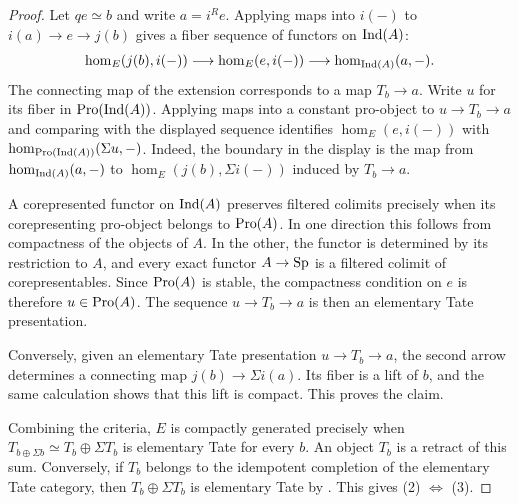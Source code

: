 \begin{proof}
		Let $qe\simeq b$ and write $a=i^Re$. Applying maps into $i(-)$ to $i(a)\to e\to j(b)$ gives a fiber sequence of functors on $\operatorname{Ind}(A)$:
		\[
			\hom_E(j(b),i(-))\longrightarrow\hom_E(e,i(-))\longrightarrow\hom_{\operatorname{Ind}(A)}(a,-).
		\]
		The connecting map of the extension corresponds to a map $T_b\to a$. Write $u$ for its fiber in $\operatorname{Pro}(\operatorname{Ind}(A))$. Applying maps into a constant pro-object to $u\to T_b\to a$ and comparing with the displayed sequence identifies $\hom_E(e,i(-))$ with $\hom_{\operatorname{Pro}(\operatorname{Ind}(A))}(\Sigma u,-)$. Indeed, the boundary in the display is the map from $\hom_{\operatorname{Ind}(A)}(a,-)$ to $\hom_E(j(b),\Sigma i(-))$ induced by $T_b\to a$.

		A corepresented functor on $\operatorname{Ind}(A)$ preserves filtered colimits precisely when its corepresenting pro-object belongs to $\operatorname{Pro}(A)$. In one direction this follows from compactness of the objects of $A$. In the other, the functor is determined by its restriction to $A$, and every exact functor $A\to{\textup{Sp}}$ is a filtered colimit of corepresentables. Since $\operatorname{Pro}(A)$ is stable, the compactness condition on $e$ is therefore $u\in\operatorname{Pro}(A)$. The sequence $u\to T_b\to a$ is then an elementary Tate presentation.

		Conversely, given an elementary Tate presentation $u\to T_b\to a$, the second arrow determines a connecting map $j(b)\to\Sigma i(a)$. Its fiber is a lift of $b$, and the same calculation shows that this lift is compact. This proves the claim.

		Combining the criteria, $E$ is compactly generated precisely when $T_{b\oplus\Sigma b}\simeq T_b\oplus\Sigma T_b$ is elementary Tate for every $b$. An object $T_b$ is a retract of this sum. Conversely, if $T_b$ belongs to the idempotent completion of the elementary Tate category, then $T_b\oplus\Sigma T_b$ is elementary Tate by . This gives (2) $\Leftrightarrow$ (3).
	\end{proof}


